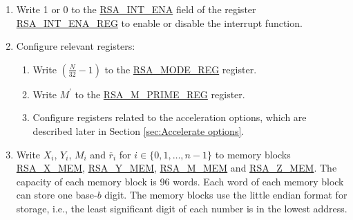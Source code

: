 \documentclass[main\_\_EN.tex]{subfiles}
\begin{document}
\begin{enumerate}

    \item Write 1 or 0 to the \hyperref[fielddesc:RSAINTENA]{RSA\_INT\_ENA} field of the register \hyperref[regdesc:RSAINTENAREG]{RSA\_INT\_ENA\_REG} to enable or disable the interrupt function.

    \item Configure relevant registers:

    \begin{enumerate}
        \item Write \begin{math}( \frac{N}{32} - 1 )\end{math} to the \hyperref[regdesc:RSAMODEREG]{RSA\_MODE\_REG} register.

        \item Write \begin{math}M^{\prime}\end{math} to the \hyperref[regdesc:RSAMPRIMEREG]{RSA\_M\_PRIME\_REG} register.

        \item Configure registers related to the acceleration options, which are described later in Section \ref{sec:Accelerate options}.

    \end{enumerate}

    \item Write
        \begin{math}X_{i}\end{math},
        \begin{math}Y_{i}\end{math},
        \begin{math}M_{i}\end{math} and
        \begin{math}\overline{r}_{i}\end{math} for \begin{math}i \in \{ 0, 1, \dots, n-1 \} \end{math}
        to memory blocks \hyperref[tab:rsa-mem]{RSA\_X\_MEM}, \hyperref[tab:rsa-mem]{RSA\_Y\_MEM}, \hyperref[tab:rsa-mem]{RSA\_M\_MEM} and \hyperref[tab:rsa-mem]{RSA\_Z\_MEM}. The capacity of each memory block is 96 words. Each word of each memory block can store one base-\begin{math}b\end{math} digit. The memory blocks use the little endian format for storage, i.e., the least significant digit of each number is in the lowest address.


\end{enumerate}
\end{document}
